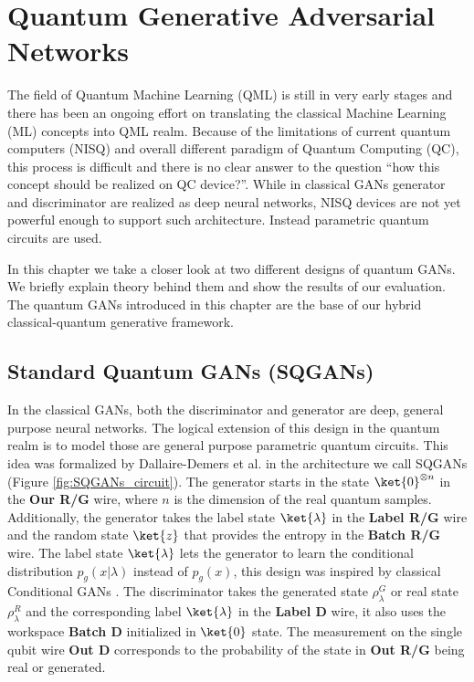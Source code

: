 \chapter{Quantum Generative Adversarial Networks}\label{chapter:quantum_gans}
The field of Quantum Machine Learning (QML) is still in very early stages and there
has been an ongoing effort on translating the  classical Machine Learning (ML)
concepts into QML realm. Because of the limitations of current quantum computers
(NISQ) \cite{bharti2021noisy} and overall different paradigm of Quantum
Computing (QC), this process is difficult and there is no clear
answer to the question ``how this concept should be realized on QC device?''.
While in classical GANs generator and discriminator are realized as deep neural
networks, NISQ devices are not yet powerful enough to support such architecture.
Instead parametric quantum circuits \cite{Schuld_2020} are used.

In this chapter we take a closer look at two different designs of quantum GANs.
We briefly explain theory behind them and show the results of our evaluation.
The quantum GANs introduced in this chapter are the base of our hybrid
classical-quantum generative framework.

\section{Standard Quantum GANs (SQGANs)}
In the classical GANs, both the discriminator and generator are deep, general
purpose neural networks. The logical extension of this design in the quantum
realm is to model those are general purpose parametric quantum circuits. This
idea was formalized by Dallaire-Demers et al. \cite{Dallaire_Demers_2018} in
the architecture we call SQGANs (Figure \ref{fig:SQGANs_circuit}). The generator
starts in the state $\ket{0}^{\otimes n}$ in the \textbf{Our R/G} wire, where
$n$ is the dimension of the real quantum samples.
Additionally, the generator takes the label state $\ket{\lambda}$ in the
\textbf{Label R/G} wire and the random state $\ket{z}$ that provides the entropy in
the \textbf{Batch R/G} wire. The label state $\ket{\lambda}$ lets the
generator to learn the conditional distribution $p_g(x|\lambda)$ instead of $p_g(x)$,
this design was inspired by classical Conditional GANs
\cite{mirza2014conditional}. The discriminator takes the generated state
$\rho_\lambda^G$ or real state $\rho_\lambda^R$ and the corresponding label
$\ket{\lambda}$ in the \textbf{Label D} wire, it also uses the workspace
\textbf{Batch D} initialized in $\ket{0}$ state. The measurement on the single
qubit wire \textbf{Out D} corresponds to the probability of the state in 
\textbf{Out R/G} being real or generated.

